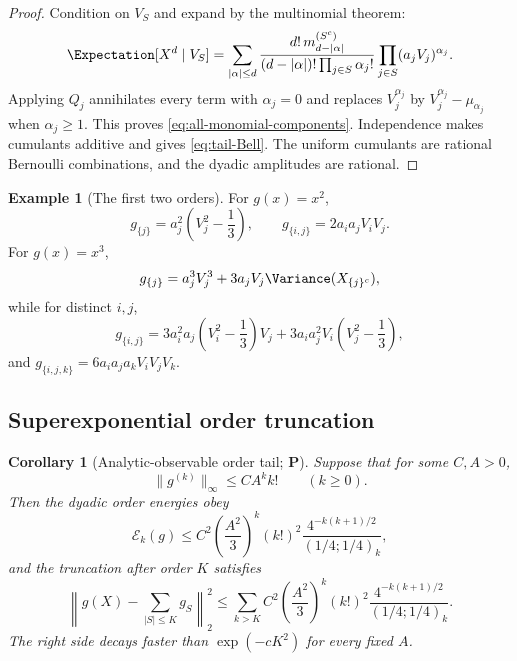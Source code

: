 \documentclass[11pt,oneside]{article}
\newtheorem{corollary}[theorem]{Corollary}
\theoremstyle{definition}
\newtheorem{example}[theorem]{Example}
\theoremstyle{remark}
\newcommand{\Ecal}{\mathcal E}
\newcommand{\statusP}{\textcolor{deepgreen}{\textbf{P}}}
\begin{document}
\begin{proof}
Condition on $V_S$ and expand by the multinomial theorem:
\[
 \Expectation[X^d\mid V_S]
 =\sum_{|\alpha|\le d}
 \frac{d!\,m_{d-|\alpha|}^{(S^c)}}
      {(d-|\alpha|)!\prod_{j\in S}\alpha_j!}
 \prod_{j\in S}(a_jV_j)^{\alpha_j}.
\]
Applying $Q_j$ annihilates every term with $\alpha_j=0$ and replaces
$V_j^{\alpha_j}$ by $V_j^{\alpha_j}-\mu_{\alpha_j}$ when
$\alpha_j\ge1$.  This proves \eqref{eq:all-monomial-components}.  Independence
makes cumulants additive and gives \eqref{eq:tail-Bell}.  The uniform cumulants
are rational Bernoulli combinations, and the dyadic amplitudes are rational.
\end{proof}

\begin{example}[The first two orders]
For $g(x)=x^2$,
\[
 g_{\{j\}}=a_j^2\left(V_j^2-\frac13\right),
 \qquad
 g_{\{i,j\}}=2a_ia_jV_iV_j.
\]
For $g(x)=x^3$,
\[
 g_{\{j\}}
 =a_j^3V_j^3+3a_jV_j\Variance(X_{\{j\}^c}),
\]
while for distinct $i,j$,
\[
 g_{\{i,j\}}
 =3a_i^2a_j\left(V_i^2-\frac13\right)V_j
 +3a_ia_j^2V_i\left(V_j^2-\frac13\right),
\]
and $g_{\{i,j,k\}}=6a_ia_ja_kV_iV_jV_k$.
\end{example}

\subsection{Superexponential order truncation}

\begin{corollary}[Analytic-observable order tail; \statusP]
\label{cor:analytic-tail}
Suppose that for some $C,A>0$,
\begin{equation}
 \|g^{(k)}\|_\infty\le CA^kk!
 \qquad(k\ge0).
 \label{eq:analytic-derivative-bound}
\end{equation}
Then the dyadic order energies obey
\begin{equation}
 \Ecal_k(g)
 \le C^2\left(\frac{A^2}{3}\right)^k(k!)^2
 \frac{4^{-k(k+1)/2}}{(1/4;1/4)_k},
 \label{eq:analytic-order-bound}
\end{equation}
and the truncation after order $K$ satisfies
\begin{equation}
 \left\|g(X)-\sum_{|S|\le K}g_S\right\|_2^2
 \le\sum_{k>K}C^2\left(\frac{A^2}{3}\right)^k(k!)^2
 \frac{4^{-k(k+1)/2}}{(1/4;1/4)_k}.
 \label{eq:analytic-tail-bound}
\end{equation}
The right side decays faster than $\exp(-cK^2)$ for every fixed $A$.
\end{corollary}
\end{document}
